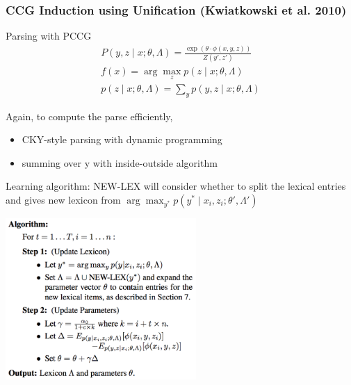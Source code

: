\documentclass{beamer}
\begin{document}
\begin{frame}
    \frametitle{CCG Induction using Unification (Kwiatkowski et al. 2010)}

     {
        Parsing with PCCG
        \begin{align*}
            P(y, z \mid x; \theta, \Lambda) = \frac{\exp(\theta\cdot\phi(x,y,z))}{Z(y',z')} \\
            f(x) = \arg\max_z p(z\mid x; \theta, \Lambda) \\
            p(z \mid x; \theta, \Lambda) = \sum_y p(y, z \mid x; \theta, \Lambda)
        \end{align*}

        Again, to compute the parse efficiently, 
        \begin{itemize}
            \item CKY-style parsing with dynamic programming
            \item summing over y with inside-outside algorithm
        \end{itemize}
    }

     {
        Learning algorithm: NEW-LEX will consider whether to split the lexical entries
        and gives new lexicon from $\arg\max_{y^*}p(y^*\mid x_i, z_i; \theta', \Lambda')$
        \begin{center}
            \includegraphics[width=7.25cm,height=6.13cm]{img/unification-learning.png}
        \end{center}
    }

\end{frame}
\end{document}
